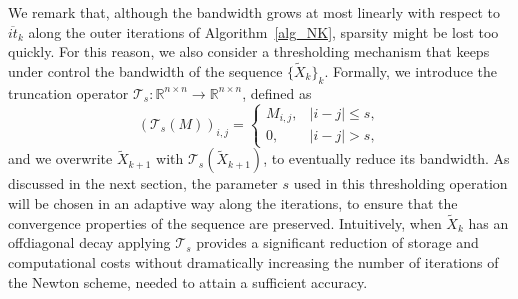 \documentclass[a4paper,10pt]{article}
\newcommand{\norm}[1]{\left\lVert#1\right\rVert}
\begin{document}

We remark that, although the bandwidth grows at most linearly with respect to $\overline{it}_k$ along the outer iterations of Algorithm~\ref{alg_NK}, sparsity might be lost too quickly.  For this reason, we also consider a thresholding mechanism that keeps under control the bandwidth of the sequence $\{\tilde{X}_k\}_k$.  Formally, we introduce the truncation operator $\mathcal{T}_s: \mathbb{R}^{n\times n} \rightarrow \mathbb{R}^{n\times n}$, defined as
\begin{equation*}
	(\mathcal{T}_s(M))_{i,j} = \begin{cases}
		M_{i,j}, & |i-j| \le s,\\
		0, & |i-j| > s,
	\end{cases}
	\label{banded}
\end{equation*}
and we overwrite $\widetilde X_{k+1}$ with  $\mathcal T_s(\widetilde X_{k+1})$, to eventually reduce its bandwidth.
As discussed in the next section, the parameter $s$ used in this thresholding operation will be chosen in an adaptive way along the iterations, to ensure that the convergence properties of the sequence are preserved. Intuitively, when $\widetilde X_k$ has an offdiagonal decay applying $\mathcal{T}_s$ provides a significant reduction of storage and computational costs without dramatically increasing the number of iterations of the Newton scheme, needed to attain a sufficient accuracy. 
\end{document}
